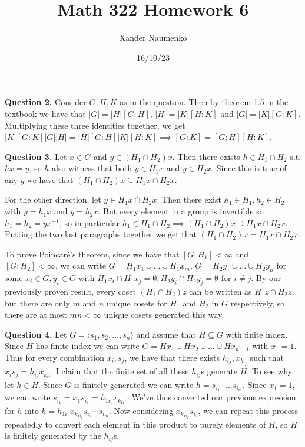 \documentclass[letterpaper, reqno,11pt]{article}
\begin{document}
\title{Math 322 Homework 6}
\date{16/10/23}
\author{Xander Naumenko}
\maketitle

{\medskip\noindent\bf Question 2.} Consider $G,H,K$ as in the question. Then by theorem 1.5 in the textbook we have that $|G|=|H|[G:H]$, $|H|=|K|[H:K]$ and $|G|=|K|[G:K]$. Multiplying these three identities together, we get $|K|[G:K]|G||H|=|H|[G:H]|K|[H:K]\implies[G:K]=[G:H][H:K]$.

{\medskip\noindent\bf Question 3.} Let $x\in G$ and $y\in (H_1\cap H_2)x$. Then there exists $h\in H_1\cap H_2$ s.t. $hx=y$, so $h$ also witness that both $y\in H_1 x$ and $y\in H_2x$. Since this is true of any $y$ we have that $(H_1\cap H_2)x\subseteq H_1x\cap H_2 x$.

For the other direction, let $y\in H_1x\cap H_2x$. Then there exist $h_1\in H_1,h_2\in H_2$ with $y=h_1x$ and $y=h_2x$. But every element in a group is invertible so $h_1=h_2=yx^{-1}$, so in particular $h_1\in H_1\cap H_2\implies(H_1\cap H_2)x\supseteq H_1x\cap H_2 x$. Putting the two last paragraphs together we get that $(H_1\cap H_2)x= H_1x\cap H_2 x$.

To prove Poincar\'e's theorem, since we have that $[G:H_1]<\infty$ and $[G:H_2]<\infty$, we can write $G=H_1x_1\cup\ldots\cup H_1 x_m$, $G=H_2y_1\cup\ldots\cup H_2 y_n$ for some $x_i\in G, y_i\in G$ with $H_1x_i\cap H_1x_j=\emptyset,H_2y_i\cap H_2y_j=\emptyset$ for $i\neq j$. By our previously proven result, every coset $(H_1\cap H_2)z$ can be written as $H_1z\cap H_2z$, but there are only $m$ and $n$ unique cosets for $H_1$ and $H_2$ in $G$ respectively, so there are at most $mn<\infty$ unique cosets generated this way.

{\medskip\noindent\bf Question 4.} Let $G= \langle s_1,s_2,\ldots, s_n\rangle$ and assume that $H\subseteq G$ with finite index. Since $H$ has finite index we can write $G=H x_1 \cup H x_2\cup \ldots\cup H x_{n-1}$ with $x_1=1$. Thus for every combination $x_i,s_j$, we have that there exists $h_{ij},x_{k_{ij}}$ such that $x_i s_j=h_{ij}x_{k_{ij}}$. I claim that the finite set of all these $h_{ij}$s generate $H$. To see why, let $h\in H$. Since $G$ is finitely generated we can write $h=s_{i_1}\cdot\ldots s_{i_m}$. Since $x_1=1$, we can write $s_{i_1}=x_1s_{i_1}=h_{1i_{1}}x_{k_{1i_1}}$. We've thus converted our previous expression for $h$ into $h=h_{1i_1}x_{k_{1i_1}}s_{i_2}\cdots s_{i_m}$. Now considering $x_{k_{1i_1}}s_{i_2}$, we can repeat this process repeatedly to convert each element in this product to purely elements of $H$, so $H$ is finitely generated by the $h_{ij}$s.
\end{document}
